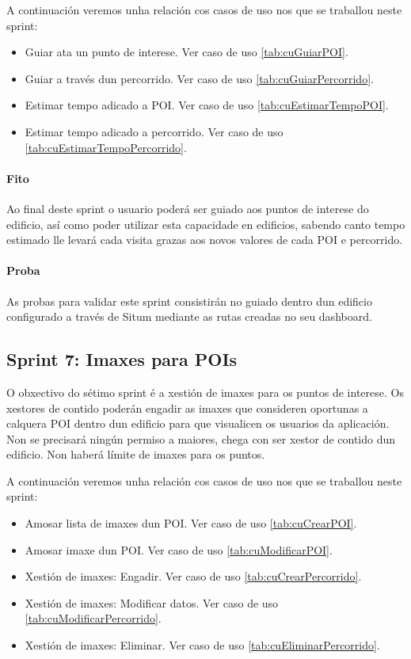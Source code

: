 A continuación veremos unha relación cos casos de uso nos que se traballou neste sprint:

\begin{itemize}
	\item Guiar ata un punto de interese. Ver caso de uso \ref{tab:cuGuiarPOI}.
	\item Guiar a través dun percorrido. Ver caso de uso \ref{tab:cuGuiarPercorrido}.
	\item Estimar tempo adicado a POI. Ver caso de uso \ref{tab:cuEstimarTempoPOI}.
	\item Estimar tempo adicado a percorrido. Ver caso de uso \ref{tab:cuEstimarTempoPercorrido}.
\end{itemize} 

\paragraph{Fito}
Ao final deste sprint o usuario poderá ser guiado aos puntos de interese do edificio, así como poder utilizar esta capacidade en edificios, sabendo canto tempo estimado lle levará cada visita grazas aos novos valores de cada POI e percorrido.

\paragraph{Proba}
As probas para validar este sprint consistirán no guiado dentro dun edificio configurado a través de Situm mediante as rutas creadas no seu dashboard.

\subsection{Sprint 7: Imaxes para POIs}
O obxectivo do sétimo sprint é a xestión de imaxes para os puntos de interese. Os xestores de contido poderán engadir as imaxes que consideren oportunas a calquera POI dentro dun edificio para que visualicen os usuarios da aplicación. Non se precisará ningún permiso a maiores, chega con ser xestor de contido dun edificio. Non haberá límite de imaxes para os puntos.

A continuación veremos unha relación cos casos de uso nos que se traballou neste sprint:

\begin{itemize}
	\item Amosar lista de imaxes dun POI. Ver caso de uso \ref{tab:cuCrearPOI}.
	\item Amosar imaxe dun POI. Ver caso de uso \ref{tab:cuModificarPOI}.
	\item Xestión de imaxes: Engadir. Ver caso de uso \ref{tab:cuCrearPercorrido}.
	\item Xestión de imaxes: Modificar datos. Ver caso de uso \ref{tab:cuModificarPercorrido}.
	\item Xestión de imaxes: Eliminar. Ver caso de uso \ref{tab:cuEliminarPercorrido}.
\end{itemize} 

